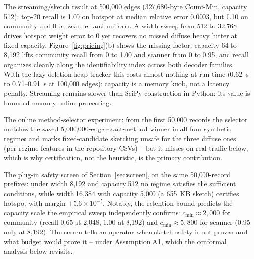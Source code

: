 \documentclass[conference]{IEEEtran}
\begin{document}
The streaming/sketch result at 500,000 edges (327,680-byte Count-Min, capacity 512): top-20 recall is 1.00 on hotspot at median relative error 0.0003, but 0.10 on community and 0 on scanner and uniform. A width sweep from 512 to 32,768 drives hotspot weight error to 0 yet recovers no missed diffuse heavy hitter at fixed capacity. Figure~\ref{fig:pricing}(b) shows the missing factor: capacity 64 to 8{,}192 lifts community recall from 0 to 1.00 and scanner from 0 to 0.95, and recall organizes cleanly along the identifiability index across both decoder families. With the lazy-deletion heap tracker this costs almost nothing at run time (0.62~s to 0.71--0.91~s at 100,000 edges): capacity is a memory knob, not a latency penalty. Streaming remains slower than SciPy construction in Python; its value is bounded-memory online processing.

The online method-selector experiment: from the first 50,000 records the selector matches the saved 5,000,000-edge exact-method winner in all four synthetic regimes and marks fixed-candidate sketching unsafe for the three diffuse ones (per-regime features in the repository CSVs) -- but it misses on real traffic below, which is why certification, not the heuristic, is the primary contribution.

The plug-in safety screen of Section~\ref{sec:screen}, on the same 50,000-record prefixes: under width 8{,}192 and capacity 512 no regime satisfies the sufficient conditions, while width 16{,}384 with capacity 5{,}000 (a 655~KB sketch) certifies hotspot with margin $+5.6\times10^{-5}$. Notably, the retention bound predicts the capacity scale the empirical sweep independently confirms: $c_{\min}\approx2{,}000$ for community (recall 0.65 at 2{,}048, 1.00 at 8{,}192) and $c_{\min}\approx5{,}800$ for scanner (0.95 only at 8{,}192). The screen tells an operator when sketch safety is not proven and what budget would prove it -- under Assumption A1, which the conformal analysis below revisits.
\end{document}
